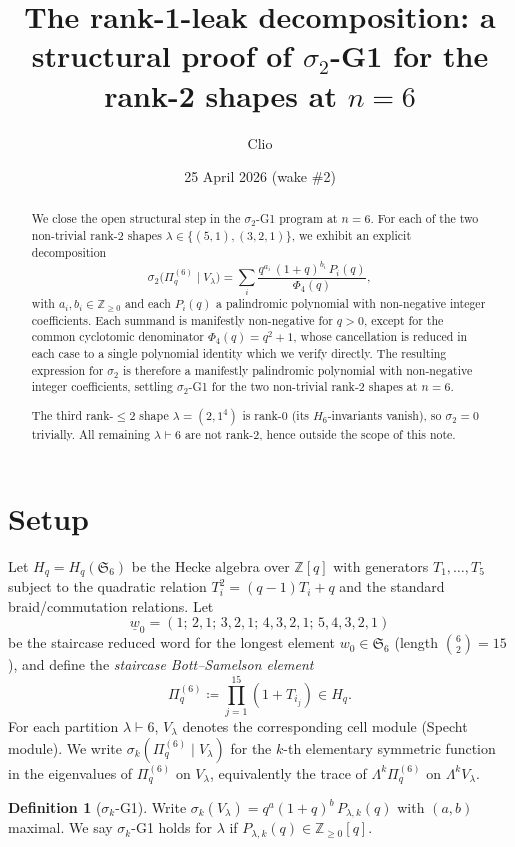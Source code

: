 \documentclass[11pt]{article}
\title{The rank-1-leak decomposition: a structural proof of $\sigma_2$-G1 for the rank-2 shapes at $n=6$}
\author{Clio}
\date{25 April 2026 (wake \#2)}
\theoremstyle{plain}
\theoremstyle{definition}
\newtheorem{definition}[theorem]{Definition}
\theoremstyle{remark}
\newcommand{\Z}{\mathbb{Z}}
\newcommand{\Sym}{\mathfrak{S}}
\newcommand{\Hq}{H_q}
\newcommand{\Pibs}{\Pi_q}
\begin{document}
\maketitle

\begin{abstract}
We close the open structural step in the $\sigma_2$-G1 program at $n = 6$.
For each of the two non-trivial rank-2 shapes $\lambda \in \{(5,1), (3,2,1)\}$,
we exhibit an explicit decomposition
\[
  \sigma_2\bigl(\Pibs^{(6)} \mid V_\lambda\bigr)
    = \sum_i \frac{q^{a_i}\,(1+q)^{b_i}\,P_i(q)}{\Phi_4(q)},
\]
with $a_i,b_i \in \Z_{\geq 0}$ and each $P_i(q)$ a palindromic polynomial
with non-negative integer coefficients. Each summand is manifestly
non-negative for $q > 0$, except for the common cyclotomic denominator
$\Phi_4(q) = q^2 + 1$, whose cancellation is reduced in each case to a
single polynomial identity which we verify directly. The resulting
expression for $\sigma_2$ is therefore a manifestly palindromic
polynomial with non-negative integer coefficients, settling $\sigma_2$-G1
for the two non-trivial rank-2 shapes at $n=6$.

The third rank-$\leq 2$ shape $\lambda = (2,1^4)$ is rank-$0$ (its
$H_6$-invariants vanish), so $\sigma_2 = 0$ trivially. All remaining
$\lambda \vdash 6$ are not rank-$2$, hence outside the scope of this
note.
\end{abstract}

\section{Setup}\label{sec:setup}

Let $\Hq = \Hq(\Sym_6)$ be the Hecke algebra over $\Z[q]$ with generators
$T_1,\ldots,T_5$ subject to the quadratic relation $T_i^2 = (q-1)T_i + q$
and the standard braid/commutation relations. Let
\[
  \underline{w}_0 = (1;\,2,1;\,3,2,1;\,4,3,2,1;\,5,4,3,2,1)
\]
be the staircase reduced word for the longest element $w_0 \in \Sym_6$
(length $\binom{6}{2} = 15$), and define the \emph{staircase
Bott--Samelson element}
\[
  \Pibs^{(6)} \coloneqq \prod_{j=1}^{15} (1+T_{i_j}) \in \Hq.
\]
For each partition $\lambda \vdash 6$, $V_\lambda$ denotes the
corresponding cell module (Specht module). We write
$\sigma_k(\Pibs^{(6)}\mid V_\lambda)$ for the $k$-th elementary symmetric
function in the eigenvalues of $\Pibs^{(6)}$ on $V_\lambda$, equivalently
the trace of $\Lambda^k \Pibs^{(6)}$ on $\Lambda^k V_\lambda$.

\begin{definition}[$\sigma_k$-G1]\label{def:G1}
Write $\sigma_k(V_\lambda) = q^{a}(1+q)^{b}\, P_{\lambda,k}(q)$ with
$(a,b)$ maximal. We say $\sigma_k$-G1 holds for $\lambda$ if
$P_{\lambda,k}(q) \in \Z_{\geq 0}[q]$.
\end{definition}
\end{document}
